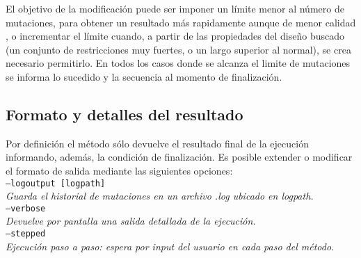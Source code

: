 El objetivo de la modificación puede ser imponer un límite menor al número de mutaciones, para obtener un resultado más rapidamente aunque de menor calidad , 
o incrementar el límite cuando, a partir de las propiedades del diseño buscado (un conjunto de restricciones muy fuertes, o un largo superior al normal), se crea necesario permitirlo.
En todos los casos donde se alcanza el limite de mutaciones se informa lo sucedido y la secuencia al momento de finalización.

\subsection{Formato y detalles del resultado}\label{output}

Por definición el método sólo devuelve el resultado final de la ejecución informando, además, la condición de finalización.
Es posible extender o modificar el formato de salida mediante las siguientes opciones:
\vspace{0.2cm}\\
\indent \texttt{--logoutput [logpath]} \\
\indent \indent \textit{Guarda el historial de mutaciones en un archivo .log ubicado en logpath.} \\
\indent \texttt{--verbose} \\
\indent \indent \textit{Devuelve por pantalla una salida detallada de la ejecución.} \\
\indent \texttt{--stepped} \\
\indent \indent \textit{Ejecución paso a paso: espera por input del usuario en cada paso del método.} \\
